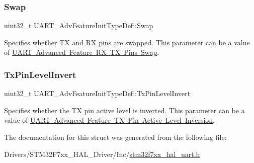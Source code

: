 \subsubsection{\texorpdfstring{Swap}{Swap}}
{\footnotesize\ttfamily uint32\+\_\+t U\+A\+R\+T\+\_\+\+Adv\+Feature\+Init\+Type\+Def\+::\+Swap}

Specifies whether TX and RX pins are swapped. This parameter can be a value of \mbox{\hyperlink{group___u_a_r_t___rx___tx___swap}{U\+A\+RT Advanced Feature RX TX Pins Swap}}. \mbox{\label{struct_u_a_r_t___adv_feature_init_type_def_ad127398802b667228c2ccb5dd5272bb5}} 
\subsubsection{\texorpdfstring{TxPinLevelInvert}{TxPinLevelInvert}}
{\footnotesize\ttfamily uint32\+\_\+t U\+A\+R\+T\+\_\+\+Adv\+Feature\+Init\+Type\+Def\+::\+Tx\+Pin\+Level\+Invert}

Specifies whether the TX pin active level is inverted. This parameter can be a value of \mbox{\hyperlink{group___u_a_r_t___tx___inv}{U\+A\+RT Advanced Feature TX Pin Active Level Inversion}}. 

The documentation for this struct was generated from the following file\+:\begin{DoxyCompactItemize}
\item 
Drivers/\+S\+T\+M32\+F7xx\+\_\+\+H\+A\+L\+\_\+\+Driver/\+Inc/\mbox{\hyperlink{stm32f7xx__hal__uart_8h}{stm32f7xx\+\_\+hal\+\_\+uart.\+h}}\end{DoxyCompactItemize}
